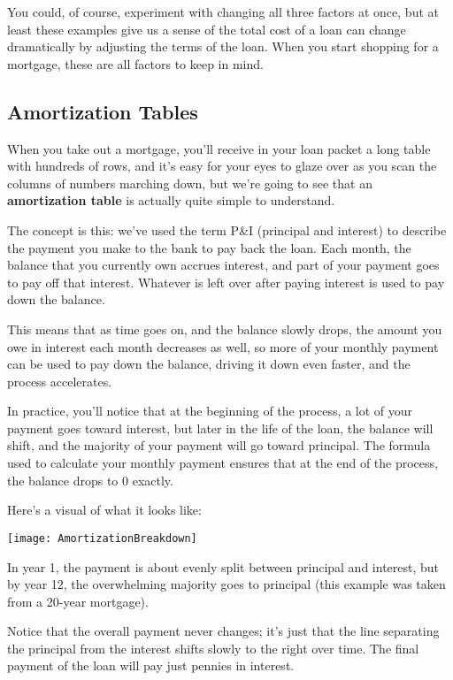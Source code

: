 You could, of course, experiment with changing all three factors at once, but at least these examples give us a sense of the total cost of a loan can change dramatically by adjusting the terms of the loan.  When you start shopping for a mortgage, these are all factors to keep in mind.

\subsection{Amortization Tables}
When you take out a mortgage, you'll receive in your loan packet a long table with hundreds of rows, and it's easy for your eyes to glaze over as you scan the columns of numbers marching down, but we're going to see that an \textbf{amortization table} is actually quite simple to understand.

The concept is this: we've used the term P\&I (principal and interest) to describe the payment you make to the bank to pay back the loan.  Each month, the balance that you currently own accrues interest, and part of your payment goes to pay off that interest.  Whatever is left over after paying interest is used to pay down the balance.

This means that as time goes on, and the balance slowly drops, the amount you owe in interest each month decreases as well, so more of your monthly payment can be used to pay down the balance, driving it down even faster, and the process accelerates.

In practice, you'll notice that at the beginning of the process, a lot of your payment goes toward interest, but later in the life of the loan, the balance will shift, and the majority of your payment will go toward principal.  The formula used to calculate your monthly payment ensures that at the end of the process, the balance drops to 0 exactly.

Here's a visual of what it looks like:
\begin{center}
\texttt{[image: AmortizationBreakdown]}
\end{center}
In year 1, the payment is about evenly split between principal and interest, but by year 12, the overwhelming majority goes to principal (this example was taken from a 20-year mortgage).

Notice that the overall payment never changes; it's just that the line separating the principal from the interest shifts slowly to the right over time.  The final payment of the loan will pay just pennies in interest.

